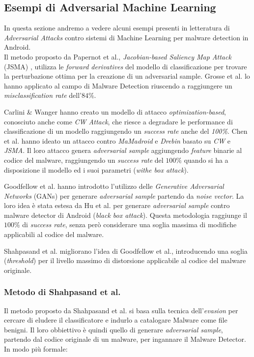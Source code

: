 \subsection{Esempi di Adversarial Machine Learning}
In questa sezione andremo a vedere alcuni esempi presenti in letteratura di \textit{Adversarial Attacks} contro sistemi di Machine Learning per malware detection in Android.\\

Il metodo proposto da Papernot et al., \textit{Jacobian-based Saliency Map Attack} (JSMA) \cite{8672711}, utilizza le \textit{forward derivatives} del modello di classificazione per trovare la perturbazione ottima per la creazione di un adversarial sample. Grosse et al. lo hanno applicato al campo di Malware Detection riuscendo a raggiungere un \textit{misclassification rate} dell'\(84\%\).

Carlini \& Wanger hanno creato un modello di attacco \textit{optimization-based}, conosciuto anche come \textit{CW Attack}\cite{8672711}, che riesce a degradare le performance di classificazione di un modello raggiungendo un \textit{success rate} anche del \textit{100\%}. Chen et al. hanno ideato un attacco contro \textit{MaMadroid} e \textit{Drebin} basato su \textit{CW} e \textit{JSMA}. Il loro attacco genera \textit{adversarial sample} aggiungendo \textit{feature} binarie al codice del malware, raggiungendo un \textit{success rate} del \(100\%\) quando si ha a disposizione il modello ed i suoi parametri (\textit{withe box attack}).

Goodfellow et al. hanno introdotto \cite{8672711} l'utilizzo delle \textit{Generative Adversarial Networks} (GANs) per generare \textit{adversarial sample} partendo da \textit{noise vector}. La loro idea è stata estesa da Hu et al. per generare \textit{adversarial sample} contro malware detector di Android (\textit{black box attack}). Questa metodologia raggiunge il \(100\%\) di \textit{success rate}, senza però considerare una soglia massima di modifiche applicabili al codice del malware.

Shahpasand et al.\cite{8672711} migliorano l'idea di Goodfellow et al., introducendo una soglia (\textit{threshold}) per il livello massimo di distorsione applicabile al codice del malware originale. 

\subsubsection{Metodo di Shahpasand et al.}
Il metodo proposto da Shahpasand et al.\cite{8672711} si basa sulla tecnica dell'\textit{evasion} per cercare di eludere il classificatore e indurlo a catalogare Malware come file benigni. Il loro obbiettivo è quindi quello di generare \textit{adversarial sample}, partendo dal codice originale di un malware, per ingannare il Malware Detector. In modo più formale:

